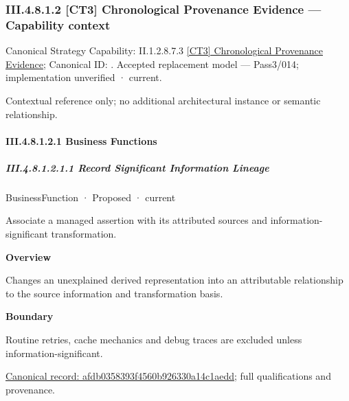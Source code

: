\subsubsection*{III.4.8.1.2 [CT3] Chronological Provenance Evidence — Capability context}
\label{navigation:III.4.8.1.2}

{\small Canonical Strategy Capability: II.1.2.8.7.3 \hyperref[element:95c06dba5448453992d55106b19f977d]{[CT3] Chronological Provenance Evidence}; Canonical ID: \texttt{}. Accepted replacement model — Pass3/014; implementation unverified · current.}\par
Contextual reference only; no additional architectural instance or semantic relationship.\par
\paragraph*{III.4.8.1.2.1 Business Functions}
\label{navigation:III.4.8.1.2.1}

\subparagraph*{III.4.8.1.2.1.1 Record Significant Information Lineage}
\label{navigation:III.4.8.1.2.1.1}

\label{element:afdb0358393f4560b926330a14c1aedd}
{\small BusinessFunction · Proposed · current}\par

Associate a managed assertion with its attributed sources and information-significant transformation.



\textbf{Overview}



Changes an unexplained derived representation into an attributable relationship to the source information and transformation basis.



\textbf{Boundary}



Routine retries, cache mechanics and debug traces are excluded unless information-significant.


{\footnotesize \href{../../../../../../../../continuum/business/business-function/afdb0358393f4560b926330a14c1aedd.md}{Canonical record: afdb0358393f4560b926330a14c1aedd}; full qualifications and provenance.}\par
